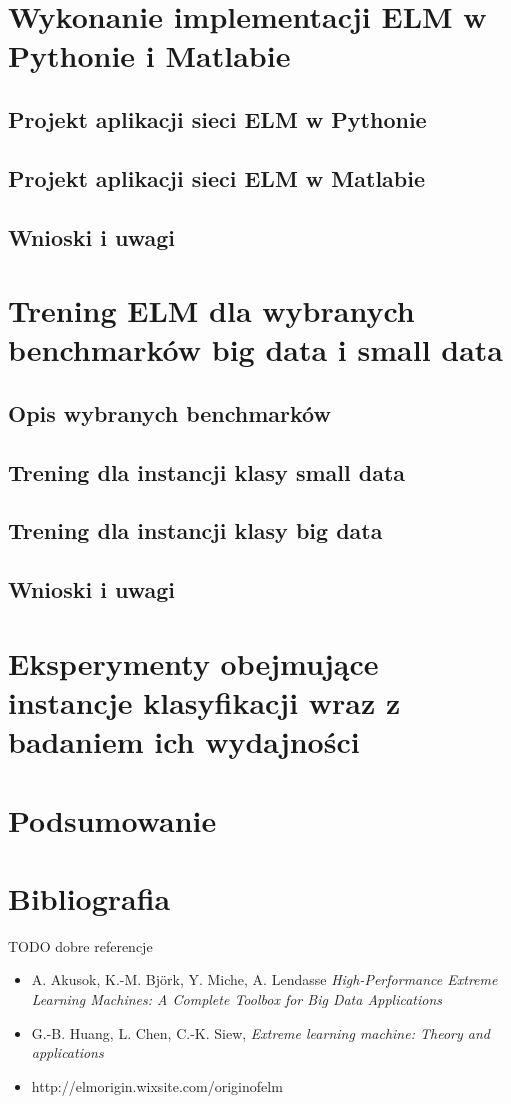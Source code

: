 \documentclass{article}
\begin{document}
\clearpage
\section{Wykonanie implementacji ELM w Pythonie i Matlabie}
\subsection{Projekt aplikacji sieci ELM w Pythonie}
\subsection{Projekt aplikacji sieci ELM w Matlabie}
\subsection{Wnioski i uwagi}
\clearpage
\section{Trening ELM dla wybranych benchmarków big data i small data}
\subsection{Opis wybranych benchmarków}
\subsection{Trening dla instancji klasy small data}
\subsection{Trening dla instancji klasy big data}
\subsection{Wnioski i uwagi}
\clearpage
\section{Eksperymenty obejmujące instancje klasyfikacji wraz z badaniem ich wydajności}
\clearpage
\section*{Podsumowanie}

\clearpage
\section*{Bibliografia}
TODO dobre referencje
\begin{itemize}
\item A. Akusok, K.-M. Björk, Y. Miche, A. Lendasse \textit{High-Performance Extreme Learning Machines: A Complete Toolbox for Big Data Applications}
\item G.-B. Huang, L. Chen, C.-K. Siew, \textit{Extreme learning machine: Theory and applications} 
\item http://elmorigin.wixsite.com/originofelm
\end{itemize}
\clearpage
\end{document}
